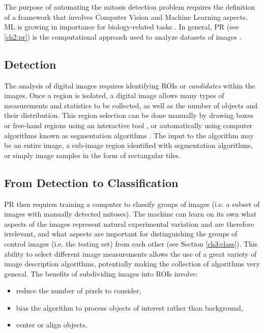 The purpose of automating the mitosis detection problem requires the definition of a framework that involves Computer Vision and Machine Learning aspects.
\Gls{ML} is growing in importance for biology-related tasks \cite{tarca2007machine}.
In general, \Gls{PR} (see \ref{ch2:pr}) is the computational approach used to analyze datasets of images \cite{patternRecSWBioImages01}.

\vspace{0.5cm}

\subsection{Detection}

The analysis of digital images requires identifying \Glspl{ROI} or \textit{candidates} within the images. Once a region is isolated,
a digital image allows many types of measurements and statistics to be collected, as well as the number of objects and their distribution.
This region selection can be done manually by drawing boxes or free-hand regions using an
interactive tool \cite{swedlow2009bioimage}, or automatically using
computer algorithms known as segmentation algorithms \cite{ljosa2009introduction}.
The input to the algorithm may be an entire image, a sub-image region identified with segmentation algorithms, or simply image samples
in the form of rectangular tiles.

\vspace{0.5cm}

\subsection{From Detection to Classification}

\Gls{PR} then requires training a computer to classify groups of images (i.e. a subset of images with manually detected mitoses).
The machine can learn on its own what aspects of the images represent natural experimental variation and are
therefore irrelevant, and what aspects are important for distinguishing the groups of
control images (i.e. the testing set) from each other (see Section \ref{ch3:class}).
This ability to select different image measurements  allows the use of a great
variety of image description algorithms, potentially making the collection of algorithms very general.
The benefits of subdividing images into \Glspl{ROI} involve:

\begin{itemize}
 \item reduce the number of pixels to consider,
 \item bias the algorithm to process objects of interest rather than background,
 \item center or align objects.
\end{itemize}

